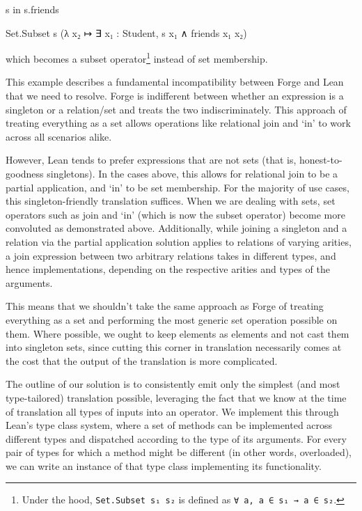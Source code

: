 \vspace{0.5em}
\noindent\begin{minipage}{0.3\textwidth}
\begin{forge*}
s in s.friends
\end{forge*}
\end{minipage}%
\begin{minipage}{0.7\textwidth}
\begin{lean*}
Set.Subset s (λ x₂ ↦ ∃ x₁ : Student, s x₁ ∧ friends x₁ x₂)
\end{lean*}
\end{minipage}
\vspace{0.5em}\newline
which becomes a subset operator\footnote{Under the hood, \texttt{Set.Subset s₁ s₂} is defined as \texttt{∀ a, a ∈ s₁ → a ∈ s₂}.} instead of set membership. 

This example describes a fundamental incompatibility between Forge and Lean that we need to resolve. Forge is indifferent between whether an expression is a singleton or a relation/set and treats the two indiscriminately. This approach of treating everything as a set allows operations like relational join and `in' to work across all scenarios alike. 

However, Lean tends to prefer expressions that are not sets (that is, honest-to-goodness singletons). In the cases above, this allows for relational join to be a partial application, and `in' to be set membership. For the majority of use cases, this singleton-friendly translation suffices. When we are dealing with sets, set operators such as join and `in' (which is now the subset operator) become more convoluted as demonstrated above. Additionally, while joining a singleton and a relation via the partial application solution applies to relations of varying arities, a join expression between two arbitrary relations takes in different types, and hence implementations, depending on the respective arities and types of the arguments. 

This means that we shouldn't take the same approach as Forge of treating everything as a set and performing the most generic set operation possible on them. Where possible, we ought to keep elements as elements and not cast them into singleton sets, since cutting this corner in translation necessarily comes at the cost that the output of the translation is more complicated. 

The outline of our solution is to consistently emit only the simplest (and most type-tailored) translation possible, leveraging the fact that we know at the time of translation all types of inputs into an operator. We implement this through Lean's type class system, where a set of methods can be implemented across different types and dispatched according to the type of its arguments. For every pair of types for which a method might be different (in other words, overloaded), we can write an instance of that type class implementing its functionality. 

